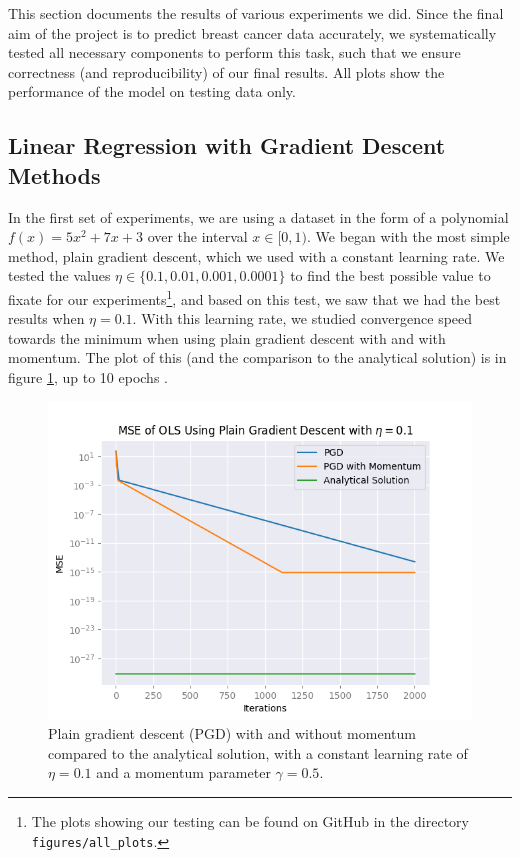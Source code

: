 This section documents the results of various experiments we did. Since the final aim of the
project is to predict breast cancer data accurately, we systematically tested all necessary components to perform this task, such that we ensure correctness (and reproducibility) of our final results. All plots show the performance of the model on testing data only.

\subsection{Linear Regression with Gradient Descent Methods}
In the first set of experiments, we are using a dataset in the form of a polynomial $f(x) = 5x^2 + 7x +3$ over the interval $x \in [0,1)$. We began with the most simple method, plain gradient descent, which we used with a constant learning rate. We tested the values $\eta \in \{ 0.1, 0.01, 0.001, 0.0001\}$ to find the best possible value to fixate for our experiments\footnote{The plots showing our testing can be found on GitHub in the directory \texttt{figures/all\_plots}.}, and based on this test, we saw that we had the best results when $\eta = 0.1$. With this learning rate, we studied convergence speed towards the minimum when using plain gradient descent with and with momentum. The plot of this (and the comparison to the analytical solution) is in figure \ref{fig:plainVSanalytical}, up to 10 epochs \cite{mediumEpochNumber}\cite{epochsBreastCancerArticle}.
\begin{figure}
    \centering
    \includegraphics[width=\linewidth]{figures/all_plots/plain_mse_pr_iter_eta_1e-1.png}
    \caption{Plain gradient descent (PGD) with and without momentum compared to the analytical solution, with a constant learning rate of $\eta = 0.1$ and a momentum parameter $\gamma = 0.5$.}
    \label{fig:plainVSanalytical}
\end{figure}

